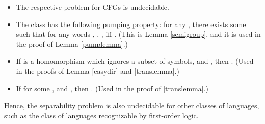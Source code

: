\documentclass{article}
\begin{document}
\begin{itemize}
\item The respective problem for CFGs is undecidable.
\item The class  has the following pumping property: for any ,
there exists some  such that for any words , , ,
 iff . (This is Lemma 
\ref{semigroup}, and it is used in the proof of Lemma \ref{pumplemma}.)
\item If  is a homomorphism which ignores a subset of symbols, 
and , then . (Used in the proofs of Lemma 
\ref{easydir} and \ref{translemma}.)
\item If 
for some , and , then . (Used in the proof of \ref{translemma}.)
\end{itemize}

Hence, the separability problem is also undecidable for other classes of languages,
such as the class of languages recognizable by first-order logic.



\end{document}
